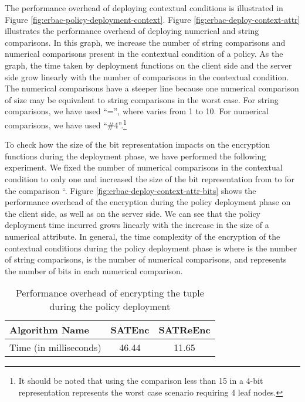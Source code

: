 \documentclass[epsfig,a4paper,11pt,titlepage]{book}
\numberwithin{algorithm}{chapter}
\begin{document}
The performance overhead of deploying contextual conditions is illustrated in Figure \ref{fig:erbac-policy-deployment-context}. Figure \ref{fig:erbac-deploy-context-attr} illustrates the performance overhead of deploying numerical and string comparisons. In this graph, we increase the number of string comparisons and numerical comparisons present in the contextual condition of a policy. As the graph, the time taken by deployment functions on the client side and the server side grow linearly with the number of comparisons in the contextual condition. The numerical comparisons have a steeper line because one numerical comparison of size  may be equivalent to  string comparisons in the worst case. For string comparisons, we have used ``='', where  varies from 1 to 10. For numerical comparisons, we have used ``\#4''.\footnote{It should be noted that using the comparison less than 15 in a 4-bit representation represents the worst case scenario requiring 4 leaf nodes.}

To check how the size of the bit representation impacts on the encryption functions during the deployment phase, we have performed the following experiment. We fixed the number of numerical comparisons in the contextual condition to only one and increased the size  of the bit representation from  to  for the comparison ``. Figure \ref{fig:erbac-deploy-context-attr-bits} shows the performance overhead of the encryption during the policy deployment phase on the client side, as well as on the server side. We can see that the policy deployment time incurred grows linearly with the increase in the size  of a numerical attribute. In general, the time complexity of the encryption of the contextual conditions during the policy deployment phase is  where  is the number of string comparisons,  is the number of numerical comparisons, and  represents the number of bits in each numerical comparison.

\begin{table} [htp]
\centering
\caption[Performance overhead of deploying the  tuple]{Performance overhead of encrypting the  tuple during the policy deployment}
\label{tab:espoon-sat-pol-deployment}
\begin{tabular}{ |l|c|c| }
\hline
\textbf{Algorithm Name} & \textbf{SATEnc} & \textbf{SATReEnc} \\ \hline
Time (in milliseconds) & 46.44 & 11.65 \\ \hline
\end{tabular}
\end{table}
\end{document}
